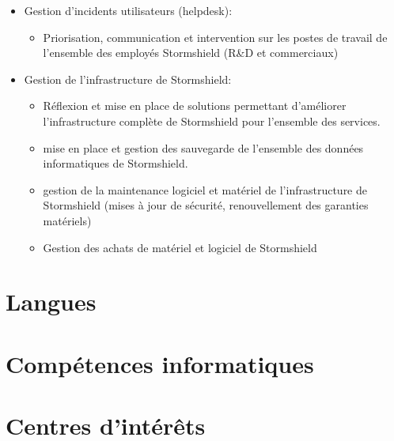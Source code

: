\documentclass[11pt,a4paper,sans]{moderncv}
\begin{document}
                {
                    \begin{itemize}
                    \item Gestion d'incidents utilisateurs (helpdesk):
                             \begin{itemize}
                              \item Priorisation, communication et intervention sur les postes de travail de l'ensemble des employés Stormshield (R\&D et commerciaux)
                             \end{itemize}
                     \end{itemize}
                     \begin{itemize}
                     \item Gestion de l'infrastructure de Stormshield:
                             \begin{itemize}
                             \item Réflexion et mise en place de solutions permettant d'améliorer l'infrastructure complète de Stormshield pour l'ensemble des services.
                             \item mise en place et gestion des sauvegarde de l'ensemble des données informatiques de Stormshield.
                             \item gestion de la maintenance logiciel et matériel de l'infrastructure de Stormshield (mises à jour de sécurité, renouvellement des garanties matériels)
                             \item Gestion des achats de matériel et logiciel de Stormshield
                             \end{itemize}
                     \end{itemize}
		} 	
\section{Langues}
\section{Compétences informatiques}
\section{Centres d'intérêts}
\end{document}
